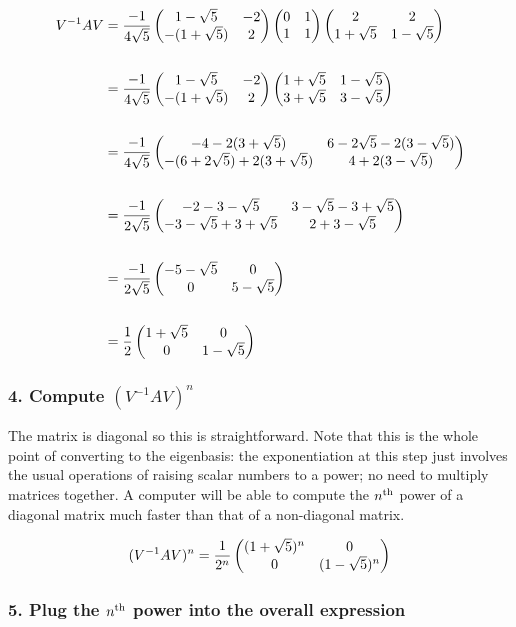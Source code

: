 \begin{align*}
V^{-1}AV &=
\frac{-1}{4\sqrt 5}
\begin{pmatrix}1 - \sqrt 5  & -2\\-(1 + \sqrt 5) & 2\\ \end{pmatrix}
\begin{pmatrix}0 & 1\\1 & 1\\ \end{pmatrix}
\begin{pmatrix}2           & 2          \\1 + \sqrt 5 & 1 - \sqrt 5\\ \end{pmatrix}
\\\\
&=
\frac{-1}{4\sqrt 5}
\begin{pmatrix}1 - \sqrt 5  & -2\\-(1 + \sqrt 5) & 2\\ \end{pmatrix}
\begin{pmatrix}1 + \sqrt 5 & 1 - \sqrt 5\\3 + \sqrt 5 & 3 - \sqrt 5\\ \end{pmatrix}
\\\\
&=
\frac{-1}{4\sqrt 5}
\begin{pmatrix}-4 - 2(3 + \sqrt 5)              & 6 - 2\sqrt 5 - 2(3 - \sqrt 5)\\-(6 + 2\sqrt 5) + 2(3 + \sqrt 5) & 4 + 2(3 - \sqrt 5)\\ \end{pmatrix}
\\\\
&=
\frac{-1}{2\sqrt 5}
\begin{pmatrix}-2 - 3 - \sqrt 5 & 3 - \sqrt 5 - 3 + \sqrt 5\\-3 - \sqrt 5 + 3 + \sqrt 5 & 2 + 3 - \sqrt 5\\ \end{pmatrix}
\\\\
&=
\frac{-1}{2\sqrt 5}
\begin{pmatrix}-5 - \sqrt 5 & 0          \\0            & 5 - \sqrt 5\\ \end{pmatrix}
\\\\
&=
\frac{1}{2}
\begin{pmatrix}1 + \sqrt 5 & 0          \\0           & 1 - \sqrt 5\\ \end{pmatrix}
\end{align*}

\subsubsection{4. Compute $(V^{-1}AV)^n$}

The matrix is diagonal so this is straightforward. Note that this is the whole
point of converting to the eigenbasis: the exponentiation at this step just
involves the usual operations of raising scalar numbers to a power; no need to
multiply matrices together. A computer will be able to compute the $n^{\text{th}}$ power
of a diagonal matrix much faster than that of a non-diagonal matrix.

$$
(V^{-1}AV)^n = \frac{1}{2^n} \begin{pmatrix}(1 + \sqrt 5)^n & 0          \\0               & (1 - \sqrt 5)^n\\ \end{pmatrix}
$$

\subsubsection{5. Plug the $n^{\text{th}}$ power into the overall expression}


